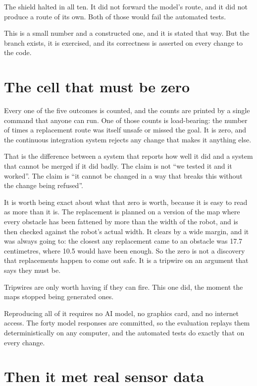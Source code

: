 \documentclass[11pt,a4paper]{article}
\begin{document}
The shield halted in all ten. It did not forward the model's route, and it did not produce a route of its own. Both of those would fail the automated tests.

This is a small number and a constructed one, and it is stated that way. But the branch exists, it is exercised, and its correctness is asserted on every change to the code.

\section{The cell that must be zero}

Every one of the five outcomes is counted, and the counts are printed by a single command that anyone can run. One of those counts is load-bearing: the number of times a replacement route was itself unsafe or missed the goal. It is zero, and the continuous integration system rejects any change that makes it anything else.

That is the difference between a system that reports how well it did and a system that cannot be merged if it did badly. The claim is not ``we tested it and it worked''. The claim is ``it cannot be changed in a way that breaks this without the change being refused''.

It is worth being exact about what that zero is worth, because it is easy to read as more than it is. The replacement is planned on a version of the map where every obstacle has been fattened by more than the width of the robot, and is then checked against the robot's actual width. It clears by a wide margin, and it was always going to: the closest any replacement came to an obstacle was 17.7 centimetres, where 10.5 would have been enough. So the zero is not a discovery that replacements happen to come out safe. It is a tripwire on an argument that says they must be.

Tripwires are only worth having if they can fire. This one did, the moment the maps stopped being generated ones.

Reproducing all of it requires no AI model, no graphics card, and no internet access. The forty model responses are committed, so the evaluation replays them deterministically on any computer, and the automated tests do exactly that on every change.

\section{Then it met real sensor data}
\end{document}
